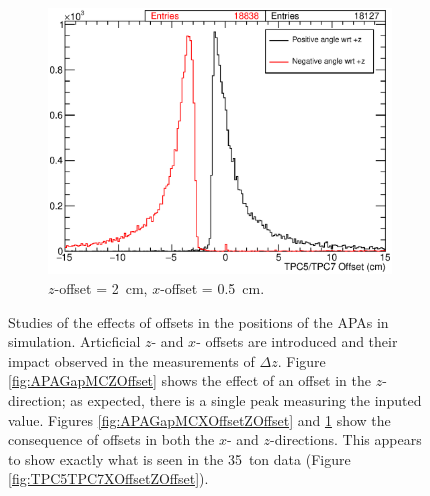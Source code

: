 \begin{figure}[p]
  \hfill
  \begin{subfigure}[t]{0.49\linewidth}
    \centering
    \includegraphics[width=\textwidth]{TPC5TPC7MCXOffsetZOffsetAngle.eps}
    \caption{$z$-offset = 2~cm, $x$-offset = 0.5~cm.}
    \label{fig:APAGapMCXOffsetZOffsetAngle}
  \end{subfigure}
  \caption{Studies of the effects of offsets in the positions of the APAs in simulation.  Articficial $z$- and $x$- offsets are introduced and their impact observed in the measurements of $\Delta z$.  Figure \ref{fig:APAGapMCZOffset} shows the effect of an offset in the $z$-direction; as expected, there is a single peak measuring the inputed value.  Figures \ref{fig:APAGapMCXOffsetZOffset} and \ref{fig:APAGapMCXOffsetZOffsetAngle} show the consequence of offsets in both the $x$- and $z$-directions.  This appears to show exactly what is seen in the 35~ton data (Figure \ref{fig:TPC5TPC7XOffsetZOffset}).}
  \label{fig:APAGapMC}
\end{figure}

